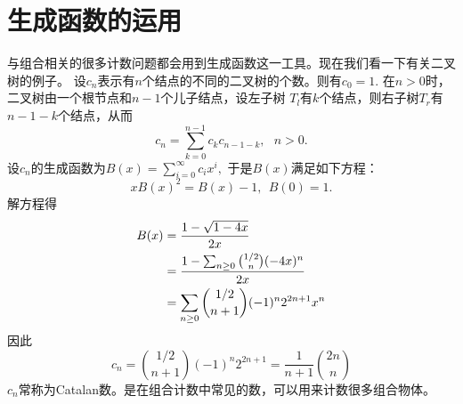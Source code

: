 \section{生成函数的运用}
与组合相关的很多计数问题都会用到生成函数这一工具。现在我们看一下有关二叉树的例子。
设$c_n$表示有$n$个结点的不同的二叉树的个数。则有$c_0=1.$ 在$n>0$时，二叉树由一个根节点和$n-1$个儿子结点，设左子树
$T_l$有$k$个结点，则右子树$T_r$有$n-1-k$个结点，从而
$$c_n=\sum_{k=0}^{n-1}c_kc_{n-1-k},\ \ \ n>0.$$
设$c_n$的生成函数为$B(x)=\sum_{i=0}^{\infty}c_ix^i,$ 于是$B(x)$满足如下方程：
$$xB(x)^2=B(x)-1,\ \ B(0)=1.$$
解方程得
\begin{align}
B(x)&=\frac{1-\sqrt{1-4x}}{2x}\notag\\
&=\frac{1-\sum_{n\geq 0}{1/2\choose n}(-4x)^n}{2x}\notag\\
&=\sum_{n\geq 0}{1/2\choose n+1}(-1)^n2^{2n+1}x^n\notag
\end{align}
因此
$$c_n={1/2\choose n+1}(-1)^n2^{2n+1}=\frac{1}{n+1}{2n\choose n}$$
$c_n$常称为Catalan数。是在组合计数中常见的数，可以用来计数很多组合物体。



